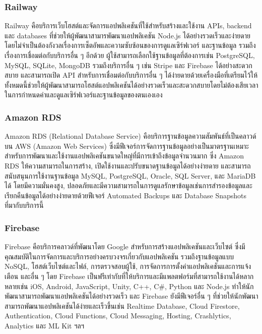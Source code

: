 \subsubsection{Railway~\cite{railway}}
Railway คือบริการเว็บโฮสต์และจัดการแอปพลิเคชันที่ใช้สำหรับสร้างและใช้งาน APIs, backend และ databases ที่ช่วยให้ผู้พัฒนาสามารพัฒนาแอปพลิเคชัน Node.js ได้อย่างรวดเร็วและง่ายดาย โดยไม่จำเป็นต้องกังวลเรื่องการเซ็ตอัพและความซับซ้อนของการดูแลเซิร์ฟเวอร์ และฐานข้อมูล รวมถึงเรื่องการเชื่อมต่อกับบริการอื่น ๆ อีกด้วย ผู้ใช้สามารถเลือกใช้ฐานข้อมูลที่ต้องการเช่น PostgreSQL, MySQL, SQLite, MongoDB รวมถึงบริการอื่น ๆ เช่น Stripe และ Firebase ได้อย่างสะดวกสบาย และสามารถเปิด API สำหรับการเชื่อมต่อกับบริการอื่น ๆ ได้ง่ายดายด้วยเครื่องมือที่เตรียมไว้ให้ ทั้งหมดนี้ช่วยให้ผู้พัฒนาสามารถโฮสต์แอปพลิเคชันได้อย่างรวดเร็วและสะดวกสบายโดยไม่ต้องเสียเวลาในการกำหนดค่าและดูแลเซิร์ฟเวอร์และฐานข้อมูลของตนเองเอง
\subsubsection{Amazon RDS~\cite{amazon_rds}}
Amazon RDS (Relational Database Service) คือบริการฐานข้อมูลความสัมพันธ์ที่เป็นคลาวด์บน AWS (Amazon Web Services) ซึ่งมีฟีเจอร์การจัดการฐานข้อมูลอย่างเป็นมาตรฐานเหมาะสำหรับการพัฒนาและใช้งานแอปพลิเคชันขนาดใหญ่ที่มีการเข้าถึงข้อมูลจำนวนมาก ซึ่ง Amazon RDS ให้ความสามารถในการสร้าง, เปิดใช้งานและปรับขนาดฐานข้อมูลได้อย่างง่ายดาย และสามารถสนับสนุนการใช้งานฐานข้อมูล MySQL, PostgreSQL, Oracle, SQL Server, และ MariaDB ได้ โดยมีความมั่นคงสูง, ปลอดภัยและมีความสามารถในการดูแลรักษาข้อมูลเช่นการสำรองข้อมูลและเรียกคืนข้อมูลได้อย่างง่ายดายด้วยฟีเจอร์ Automated Backups และ Database Snapshots ที่มากับบริการนี้
\subsubsection{Firebase~\cite{firebase}}
Firebase คือบริการคลาวด์ที่พัฒนาโดย Google สำหรับการสร้างแอปพลิเคชันและเว็บไซต์ ซึ่งมีคุณสมบัติในการจัดการและบริการอย่างครบวงจรเกี่ยวกับแอปพลิเคชัน รวมถึงฐานข้อมูลแบบ NoSQL, โฮสต์เว็บไซต์และไฟล์, การตรวจสอบผู้ใช้, การจัดการการตั้งค่าแอปพลิเคชันและการแจ้งเตือน และอื่น ๆ โดย Firebase เป็นฟรีเท่ากับที่ให้บริการและมีแพลตฟอร์มที่สามารถใช้งานได้หลากหลายเช่น iOS, Android, JavaScript, Unity, C++, C\#, Python และ Node.js ทำให้นักพัฒนาสามารถพัฒนาแอปพลิเคชันได้อย่างรวดเร็ว และ Firebase ยังมีฟีเจอร์อื่น ๆ ที่ช่วยให้นักพัฒนาสามารถพัฒนาแอปพลิเคชันได้ง่ายและเร็วขึ้นเช่น Realtime Database, Cloud Firestore, Authentication, Cloud Functions, Cloud Messaging, Hosting, Crashlytics, Analytics และ ML Kit ฯลฯ
